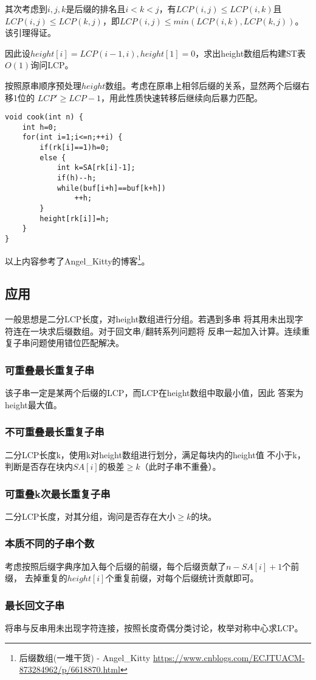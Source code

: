 其次考虑到$i,j,k$是后缀的排名且$i<k<j$，有$LCP(i,j)\leq LCP(i,k)$且
$LCP(i,j)\leq LCP(k,j)$，即$LCP(i,j)\leq min(LCP(i,k),LCP(k,j))$。
该引理得证。

因此设$height[i]=LCP(i-1,i),height[1]=0$，求出height数组后构建ST表$O(1)$询问LCP。

按照原串顺序预处理$height$数组。考虑在原串上相邻后缀的关系，显然两个后缀右移1位的
$LCP'\geq LCP-1$，用此性质快速转移后继续向后暴力匹配。

\begin{lstlisting}
void cook(int n) {
    int h=0;
    for(int i=1;i<=n;++i) {
        if(rk[i]==1)h=0;
        else {
            int k=SA[rk[i]-1];
            if(h)--h;
            while(buf[i+h]==buf[k+h])
                ++h;
        }
        height[rk[i]]=h;
    }
}
\end{lstlisting}
以上内容参考了Angel\_Kitty的博客\footnote{后缀数组(一堆干货) - Angel\_Kitty
    \url{https://www.cnblogs.com/ECJTUACM-873284962/p/6618870.html}
}。
\subsection{应用}
一般思想是二分LCP长度，对height数组进行分组。若遇到多串
将其用未出现字符连在一块求后缀数组。对于回文串/翻转系列问题将
反串一起加入计算。连续重复子串问题使用错位匹配解决。
\subsubsection{可重叠最长重复子串}
该子串一定是某两个后缀的LCP，而LCP在height数组中取最小值，因此
答案为height最大值。
\subsubsection{不可重叠最长重复子串}
二分LCP长度k，使用k对height数组进行划分，满足每块内的height值
不小于k，判断是否存在块内$SA[i]$的极差$\geq k$（此时子串不重叠）。
\subsubsection{可重叠k次最长重复子串}
二分LCP长度，对其分组，询问是否存在大小$\geq k$的块。
\subsubsection{本质不同的子串个数}
考虑按照后缀字典序加入每个后缀的前缀，每个后缀贡献了$n-SA[i]+1$个前缀，
去掉重复的$height[i]$个重复前缀，对每个后缀统计贡献即可。
\subsubsection{最长回文子串}
将串与反串用未出现字符连接，按照长度奇偶分类讨论，枚举对称中心求LCP。
